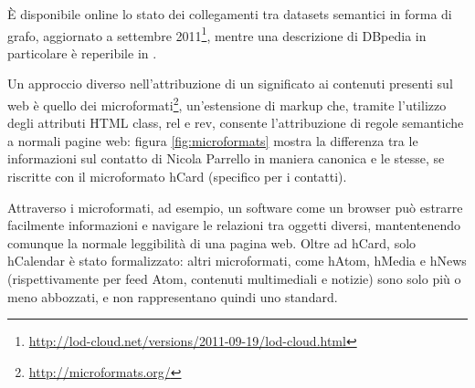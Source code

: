 \documentclass[sigproc-sp.tex]{subfiles}
\begin{document}
\`{E} disponibile online lo stato dei collegamenti tra datasets semantici in forma di grafo, aggiornato a settembre 2011\footnote{\url{http://lod-cloud.net/versions/2011-09-19/lod-cloud.html}}, mentre una descrizione di DBpedia in particolare è reperibile in \cite{bizer2009dbpedia}.

Un approccio diverso nell’attribuzione di un significato ai contenuti presenti sul web è quello dei microformati\footnote{\url{http://microformats.org/}}, un’estensione di markup che, tramite l’utilizzo degli attributi HTML class, rel e rev, consente l’attribuzione di regole semantiche a normali pagine web: figura \ref{fig:microformats} mostra la differenza tra le informazioni sul contatto di Nicola Parrello in maniera canonica e le stesse, se 
riscritte con il microformato hCard (specifico per i contatti).

Attraverso i microformati, ad esempio, un software come un browser può estrarre facilmente informazioni e navigare le relazioni tra oggetti diversi, mantentenendo comunque la normale leggibilità di una pagina web. Oltre ad hCard, solo hCalendar è stato formalizzato: altri microformati, come hAtom, hMedia e hNews (rispettivamente per feed Atom, contenuti multimediali e notizie) sono solo più o meno abbozzati, e non rappresentano quindi uno standard.
\end{document}
